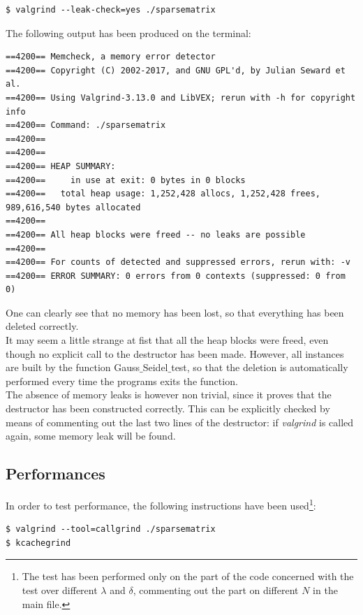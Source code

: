 \documentclass[11pt]{article}
\theoremstyle{theorem}
\theoremstyle{definition}
\begin{document}
\begin{verbatim}
$ valgrind --leak-check=yes ./sparsematrix
\end{verbatim}

The following output has been produced on the terminal:

\begin{verbatim}
==4200== Memcheck, a memory error detector
==4200== Copyright (C) 2002-2017, and GNU GPL'd, by Julian Seward et al.
==4200== Using Valgrind-3.13.0 and LibVEX; rerun with -h for copyright info
==4200== Command: ./sparsematrix
==4200== 
==4200== 
==4200== HEAP SUMMARY:
==4200==     in use at exit: 0 bytes in 0 blocks
==4200==   total heap usage: 1,252,428 allocs, 1,252,428 frees, 989,616,540 bytes allocated
==4200== 
==4200== All heap blocks were freed -- no leaks are possible
==4200== 
==4200== For counts of detected and suppressed errors, rerun with: -v
==4200== ERROR SUMMARY: 0 errors from 0 contexts (suppressed: 0 from 0)
\end{verbatim}

One can clearly see that no memory has been lost, so that everything has been deleted correctly. \\
It may seem a little strange at fist that all the heap blocks were freed, even though no explicit call to the destructor has been made. However, all instances are built by the function Gauss$\_$Seidel$\_$test, so that the deletion is automatically performed every time the programs exits the function.\\
The absence of memory leaks is however non trivial, since it proves that the destructor has been constructed correctly. This can be explicitly checked by means of commenting out the last two lines of the destructor: if \emph{valgrind} is called again, some memory leak will be found.\\ 


\subsection{Performances}
\label{subsec:perf}
In order to test performance, the following instructions have been used\footnote{The test has been performed only on the part of the code concerned with the test over different $\lambda$ and $\delta$, commenting out the part on different $N$ in the main file. }:
\begin{verbatim}
$ valgrind --tool=callgrind ./sparsematrix
$ kcachegrind
\end{verbatim}
\end{document}
